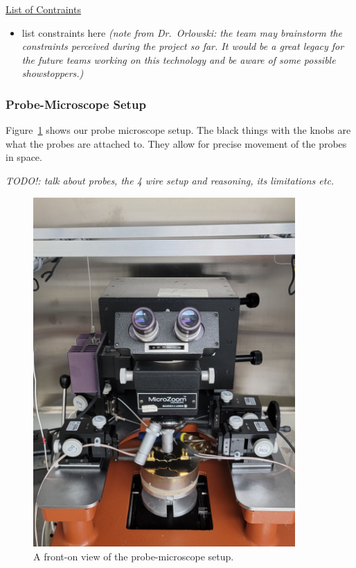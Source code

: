 \documentclass{article}
\begin{document}
          \underline{List of Contraints}
          \begin{itemize}
            \item list constraints here \textit{(note from Dr.\ Orlowski: the team may brainstorm the constraints
            perceived during the project so far. It would be a great legacy for the future teams working on this
            technology and be aware of some possible showstoppers.)}
          \end{itemize}
        
        \newpage
        \subsubsection{Probe-Microscope Setup}
          Figure~\ref{probemicro} shows our probe microscope setup. The black things with the knobs are what the probes
          are attached to. They allow for precise movement of the probes in space.

          \textit{TODO!: talk about probes, the 4 wire setup and reasoning, its limitations etc.}
          
          \begin{figure}[H]
            \centering
            \includegraphics[width=10cm]{figures/probeapparatus_front.jpg}
            \caption{A front-on view of the probe-microscope setup.}
            \label{probemicro}
          \end{figure}
\end{document}
